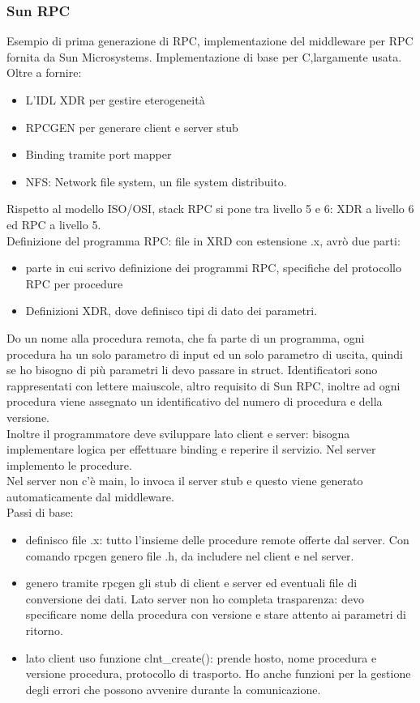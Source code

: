 \documentclass{article}
\begin{document}
\subsubsection{Sun RPC}
Esempio di prima generazione di RPC, implementazione del middleware per RPC fornita da Sun Microsystems. Implementazione di base per C,largamente usata. Oltre a fornire:
\begin{itemize}
\item L'IDL XDR per gestire eterogeneità
\item RPCGEN per generare client e server stub
\item Binding tramite port mapper
\item NFS: Network file system, un file system distribuito.
\end{itemize}
Rispetto al modello ISO/OSI, stack RPC si pone tra livello 5 e 6: XDR  a livello 6 ed RPC a livello 5.\\ Definizione del programma RPC:
file in XRD con estensione .x, avrò due parti:
\begin{itemize}
\item parte in cui scrivo definizione dei programmi RPC, specifiche del protocollo RPC per procedure
\item Definizioni XDR, dove definisco tipi di dato dei parametri.
\end{itemize}
Do un nome alla procedura remota, che fa parte di un programma, ogni procedura ha un solo parametro di input ed un solo parametro di uscita, quindi se ho bisogno di più parametri li devo passare in struct. Identificatori sono rappresentati con lettere maiuscole, altro requisito di Sun RPC, inoltre ad ogni procedura viene assegnato un identificativo del numero di procedura e della versione.\\ Inoltre il programmatore deve sviluppare lato client e server: bisogna implementare logica per effettuare binding e reperire il servizio. Nel server implemento le procedure.\\Nel server non c'è main, lo invoca il server stub e questo viene generato automaticamente dal middleware.
\\Passi di base:
\begin{itemize}
\item definisco file .x: tutto l'insieme delle procedure remote offerte dal server. Con comando rpcgen genero file .h, da includere nel client e nel server.
\item genero tramite rpcgen gli stub di client e server ed eventuali file di conversione dei dati. Lato server non ho completa trasparenza: devo specificare nome della procedura con versione e stare attento ai parametri di ritorno.
\item lato client uso funzione clnt\_create(): prende hosto, nome procedura e versione procedura, protocollo di trasporto. Ho anche funzioni per la gestione degli errori che possono avvenire durante la comunicazione.
\end{itemize}
\end{document}
